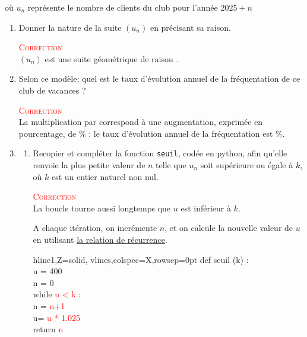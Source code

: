 où $u_n$ représente le nombre de clients du club pour l'année \mbox{$2025+n$}
\begin{enumerate}
	\item Donner la nature de la suite $(u_n)$ en précisant sa raison.

					\textcolor{red}{\textsc{Correction}}\\
					$(u_n)$ est une suite géométrique de raison .
	\item Selon ce modèle; quel est le taux d'évolution annuel de la fréquentation de ce club de vacances ?

					\textcolor{red}{\textsc{Correction}}\\
					La multiplication par  correspond à une augmentation, exprimée en pourcentage, de \% : le taux d'évolution annuel de la fréquentation est \%.
	\item
	 \begin{enumerate}
	\item
	\begin{minipage}[t]{0.66\linewidth}\vspace{0mm}
		Recopier et compléter la fonction \texttt{seuil}, codée en python, afin qu'elle renvoie la plus petite valeur de $n$ telle que $u_n$ soit supérieure ou égale à $k$, où $k$ est un entier naturel non nul.

				\textcolor{red}{\textsc{Correction}}\\
				La boucle \og{}tourne\fg{} aussi longtemps que $u$ est inférieur à $k$.

				A chaque itération, on incrémente $n$, et on calcule la nouvelle valeur de $u$ en utilisant \underline{la relation de récurrence}.
\end{minipage}
\hspace{0.05\linewidth}
	\begin{minipage}[t]{0.33\linewidth}\vspace{0cm}
	\begin{ttfamily}%
\begin{tblr}{hline{1,Z}={solid}, vlines,colspec={X},rowsep=0pt}%
	def seuil (k) :\\
	\qquad u = 400\\
	\qquad n = 0\\
	\qquad while  \textcolor{red}{u < k} :\\
	\qquad\qquad  n = \textcolor{red}{n+1}\\
	\qquad\qquad  u= \textcolor{red}{u * 1.025}\\
	\qquad return \textcolor{red}{n}\\
\end{tblr}
\end{ttfamily}
\end{minipage}



\end{enumerate}
\end{enumerate}
